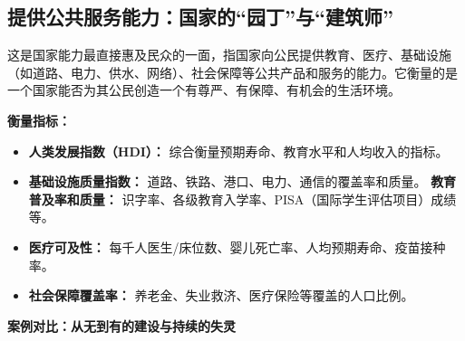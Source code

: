 \subsection{提供公共服务能力：国家的“园丁”与“建筑师”}

这是国家能力最直接惠及民众的一面，指国家向公民提供教育、医疗、基础设施（如道路、电力、供水、网络）、社会保障等公共产品和服务的能力。它衡量的是一个国家能否为其公民创造一个有尊严、有保障、有机会的生活环境。

\textbf{衡量指标：}
\begin{itemize}
    \item \textbf{人类发展指数（HDI）：} 综合衡量预期寿命、教育水平和人均收入的指标。
    \item \textbf{基础设施质量指数：} 道路、铁路、港口、电力、通信的覆盖率和质量。
    \textbf{教育普及率和质量：} 识字率、各级教育入学率、PISA（国际学生评估项目）成绩等。
    \item \textbf{医疗可及性：} 每千人医生/床位数、婴儿死亡率、人均预期寿命、疫苗接种率。
    \item \textbf{社会保障覆盖率：} 养老金、失业救济、医疗保险等覆盖的人口比例。
\end{itemize}

\textbf{案例对比：从无到有的建设与持续的失灵}

